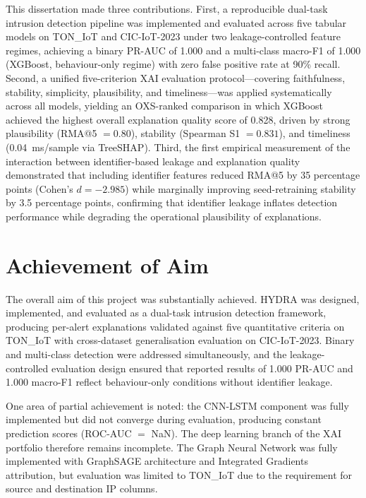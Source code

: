 \documentclass[12pt,a4paper]{report}
\begin{document}
This dissertation made three contributions. First, a reproducible dual-task intrusion detection pipeline was implemented and evaluated across five tabular models on TON\_IoT and CIC-IoT-2023 under two leakage-controlled feature regimes, achieving a binary PR-AUC of 1.000 and a multi-class macro-F1 of 1.000 (XGBoost, behaviour-only regime) with zero false positive rate at 90\% recall. Second, a unified five-criterion XAI evaluation protocol---covering faithfulness, stability, simplicity, plausibility, and timeliness---was applied systematically across all models, yielding an OXS-ranked comparison in which XGBoost achieved the highest overall explanation quality score of 0.828, driven by strong plausibility (RMA@5 $= 0.80$), stability (Spearman S1 $= 0.831$), and timeliness (0.04~ms/sample via TreeSHAP). Third, the first empirical measurement of the interaction between identifier-based leakage and explanation quality demonstrated that including identifier features reduced RMA@5 by 35 percentage points (Cohen's $d = -2.985$) while marginally improving seed-retraining stability by 3.5 percentage points, confirming that identifier leakage inflates detection performance while degrading the operational plausibility of explanations.

\section{Achievement of Aim}
\label{sec:achievement}

The overall aim of this project was substantially achieved. HYDRA was designed, implemented, and evaluated as a dual-task intrusion detection framework, producing per-alert explanations validated against five quantitative criteria on TON\_IoT with cross-dataset generalisation evaluation on CIC-IoT-2023. Binary and multi-class detection were addressed simultaneously, and the leakage-controlled evaluation design ensured that reported results of 1.000 PR-AUC and 1.000 macro-F1 reflect behaviour-only conditions without identifier leakage.

One area of partial achievement is noted: the CNN-LSTM component was fully implemented but did not converge during evaluation, producing constant prediction scores (ROC-AUC $=$ NaN). The deep learning branch of the XAI portfolio therefore remains incomplete. The Graph Neural Network was fully implemented with GraphSAGE architecture and Integrated Gradients attribution, but evaluation was limited to TON\_IoT due to the requirement for source and destination IP columns.
\end{document}
